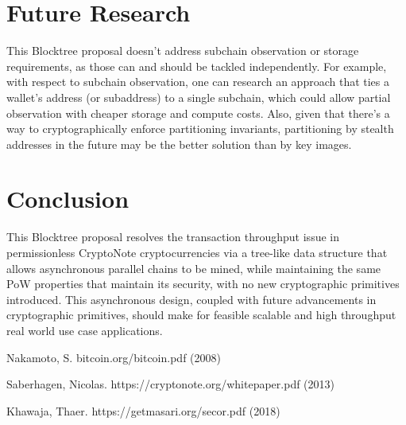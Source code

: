 \documentclass{article}
\begin{document}
\section{Future Research}
This Blocktree proposal doesn't address subchain observation or storage requirements, as those can and should be tackled independently. For example, with respect to subchain observation, one can research an approach that ties a wallet's address (or subaddress) to a single subchain, which could allow partial observation with cheaper storage and compute costs. Also, given that there's a way to cryptographically enforce partitioning invariants, partitioning by stealth addresses in the future may be the better solution than by key images.
\section{Conclusion}
This Blocktree proposal resolves the transaction throughput issue in permissionless CryptoNote cryptocurrencies via a tree-like data structure that allows asynchronous parallel chains to be mined, while maintaining the same PoW properties that maintain its security, with no new cryptographic primitives introduced. This asynchronous design, coupled with future advancements in cryptographic primitives, should make for feasible scalable and high throughput real world use case applications.

\begin{thebibliography}{999}
  Nakamoto, S.
  \newblock bitcoin.org/bitcoin.pdf (2008)

  Saberhagen, Nicolas.
  \newblock https://cryptonote.org/whitepaper.pdf (2013)

  Khawaja, Thaer.
  \newblock https://getmasari.org/secor.pdf (2018)
\end{thebibliography}
\end{document}
